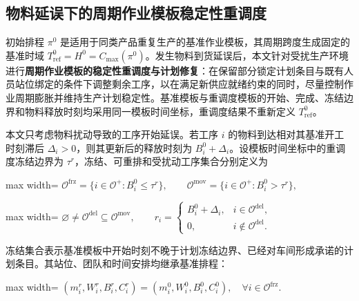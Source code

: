 \documentclass[journal,10pt]{IEEEtran}
\begin{document}
\subsection{物料延误下的周期作业模板稳定性重调度}\label{ux7269ux6599ux5ef6ux8befux4e0bux7684ux5468ux671fux4f5cux4e1aux6a21ux677fux7a33ux5b9aux6027ux91cdux8c03ux5ea6}

初始排程 \(\pi^0\) 是适用于同类产品重复生产的基准作业模板，其周期跨度生成固定的基准时域 \(T_{\mathrm{ref}}^0=H^0=C_{\max}(\pi^0)\)。发生物料到货延误后，本文针对受扰生产环境进行\textbf{周期作业模板的稳定性重调度与计划修复}：在保留部分锁定计划条目与既有人员站位绑定的条件下调整剩余工序，以在满足新供应就绪约束的同时，尽量控制作业周期膨胀并维持生产计划稳定性。基准模板与重调度模板的开始、完成、冻结边界和物料释放时刻均采用同一模板时间坐标，重调度结果不重新定义 \(T_{\mathrm{ref}}^0\)。

本文只考虑物料扰动导致的工序开始延误。若工序 \(i\) 的物料到达相对其基准开工时刻滞后 \(\Delta_i>0\)，则其更新后的释放时刻为 \(B_i^0+\Delta_i\)。设模板时间坐标中的重调度冻结边界为 \(\tau^r\)，冻结、可重排和受扰动工序集合分别定义为

\begin{center}
\begin{adjustbox}{max width=\columnwidth}
$\displaystyle
\mathcal{O}^{\mathrm{frz}}
=\{i\in\mathcal{O}^{+}:B_i^0\le\tau^r\},
\qquad
\mathcal{O}^{\mathrm{mov}}
=\{i\in\mathcal{O}^{+}:B_i^0>\tau^r\},
$
\end{adjustbox}
\end{center}

\begin{center}
\begin{adjustbox}{max width=\columnwidth}
$\displaystyle
\varnothing\ne\mathcal{O}^{\mathrm{del}}\subseteq\mathcal{O}^{\mathrm{mov}},
\qquad
r_i=
\begin{cases}
B_i^0+\Delta_i, & i\in\mathcal{O}^{\mathrm{del}},\\
0, & i\notin\mathcal{O}^{\mathrm{del}}.
\end{cases}
$
\end{adjustbox}
\end{center}

冻结集合表示基准模板中开始时刻不晚于计划冻结边界、已经对车间形成承诺的计划条目。其站位、团队和时间安排均继承基准排程：

\begin{center}
\begin{adjustbox}{max width=\columnwidth}
$\displaystyle
(m_i^r,W_i^r,B_i^r,C_i^r)
=(m_i^0,W_i^0,B_i^0,C_i^0),
\quad \forall i\in\mathcal{O}^{\mathrm{frz}}.
$
\end{adjustbox}
\end{center}
\end{document}
